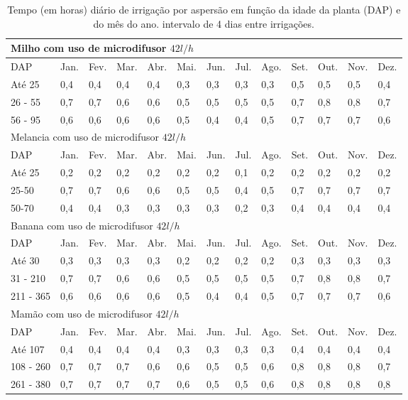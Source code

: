 \begin{table}[]
	\centering
	\caption{Tempo (em horas) diário de irrigação por aspersão em função da idade da planta (DAP) e do mês do ano. intervalo de 4 dias entre irrigações.}
	\label{table:consumo2}
	\begin{tabular}{lllllllllllll}
		\hline
		\multicolumn{13}{l}{Milho com uso de microdifusor \(42 l/h\)} \\
		\hline
		DAP	& Jan. & Fev. & Mar. & Abr. & Mai. & Jun. & Jul. & Ago. & Set. & Out. & Nov. & Dez. \\
		Até 25& 0,4& 0,4& 0,4& 0,4& 0,3& 0,3& 0,3& 0,3& 0,5& 0,5& 0,5& 0,4 \\
		26 - 55& 0,7& 0,7& 0,6& 0,6& 0,5& 0,5& 0,5& 0,5& 0,7& 0,8& 0,8& 0,7 \\
		56 - 95& 0,6& 0,6& 0,6& 0,6& 0,5& 0,4& 0,4& 0,5& 0,7& 0,7& 0,7& 0,6 \\
		\hline
		\multicolumn{13}{l}{Melancia com uso de microdifusor \(42 l/h\)} \\ 
		\hline
		DAP & Jan. & Fev. & Mar. & Abr. & Mai. & Jun. & Jul. & Ago. & Set. & Out. & Nov. & Dez. \\			
		Até 25& 0,2& 0,2& 0,2& 0,2& 0,2& 0,2& 0,1& 0,2& 0,2& 0,2& 0,2& 0,2 \\
		25-50& 0,7& 0,7& 0,6& 0,6& 0,5& 0,5& 0,4& 0,5& 0,7& 0,7& 0,7& 0,7 \\
		50-70& 0,4& 0,4& 0,3& 0,3& 0,3& 0,3& 0,2& 0,3& 0,4& 0,4& 0,4& 0,4 \\
		\hline
		\multicolumn{13}{l}{Banana com uso de microdifusor \(42 l/h\)} \\
		\hline
		DAP & Jan. & Fev. & Mar. & Abr. & Mai. & Jun. & Jul. & Ago. & Set. & Out. & Nov. & Dez. \\			
		Até 30& 0,3& 0,3& 0,3& 0,3& 0,2& 0,2& 0,2& 0,2& 0,3& 0,3& 0,3& 0,3 \\
		31 - 210& 0,7& 0,7& 0,6& 0,6& 0,5& 0,5& 0,5& 0,5& 0,7& 0,8& 0,8& 0,7 \\
		211 - 365& 0,6& 0,6& 0,6& 0,6& 0,5& 0,4& 0,4& 0,5& 0,7& 0,7& 0,7& 0,6 \\
		\hline
		\multicolumn{13}{l}{Mam\~{a}o com uso de microdifusor \(42 l/h\)} \\
		\hline
		DAP & Jan. & Fev. & Mar. & Abr. & Mai. & Jun. & Jul. & Ago. & Set. & Out. & Nov. & Dez. \\	
		Até 107& 0,4& 0,4& 0,4& 0,4& 0,3& 0,3& 0,3& 0,3& 0,4& 0,4& 0,4& 0,4 \\
		108 - 260& 0,7& 0,7& 0,7& 0,6& 0,6& 0,5& 0,5& 0,6& 0,8& 0,8& 0,8& 0,7 \\
		261 - 380& 0,7& 0,7& 0,7& 0,7& 0,6& 0,5& 0,5& 0,6& 0,8& 0,8& 0,8& 0,8 \\
		\hline
	\end{tabular}
\end{table}

